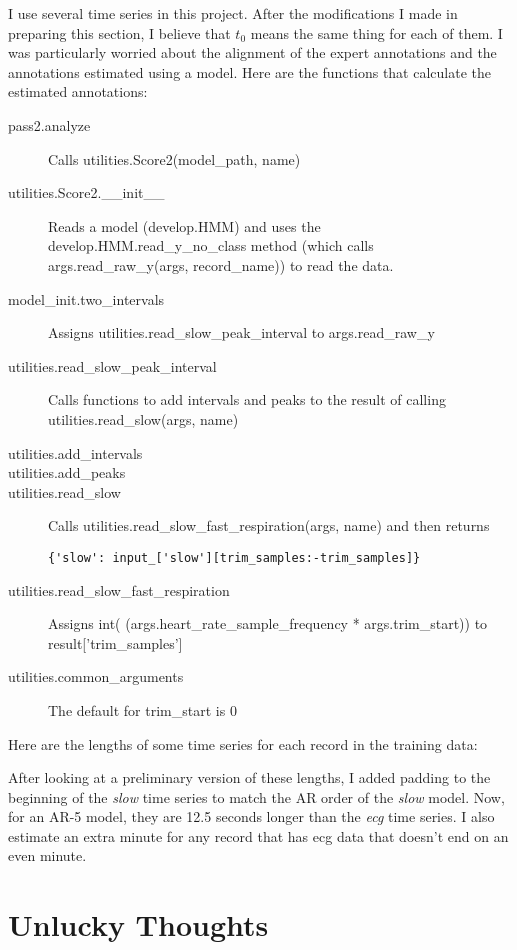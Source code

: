 \documentclass[12pt]{article}
\begin{document}
I use several time series in this project.  After the modifications I
made in preparing this section, I believe that $t_0$ means the same
thing for each of them.  I was particularly worried about the alignment
of the expert annotations and the annotations estimated using a model.
Here are the functions that calculate the estimated annotations:
\begin{description}
\item[pass2.analyze] Calls utilities.Score2(model\_path, name)
\item[utilities.Score2.\_\_init\_\_] Reads a model (develop.HMM) and
  uses the develop.HMM.read\_y\_no\_class method (which calls
  args.read\_raw\_y(args, record\_name)) to read the data.
\item[model\_init.two\_intervals] Assigns
  utilities.read\_slow\_peak\_interval to args.read\_raw\_y
\item[utilities.read\_slow\_peak\_interval] Calls functions to add
  intervals and peaks to the result of calling
  utilities.read\_slow(args, name)
\item[utilities.add\_intervals] 
\item[utilities.add\_peaks]
\item[utilities.read\_slow] Calls
  utilities.read\_slow\_fast\_respiration(args, name) and then returns
\begin{verbatim}
{'slow': input_['slow'][trim_samples:-trim_samples]}
\end{verbatim}
\item[utilities.read\_slow\_fast\_respiration] Assigns int(
  (args.heart\_rate\_sample\_frequency * args.trim\_start)) to
  result['trim\_samples']
\item[utilities.common\_arguments] The default for trim\_start is 0
\end{description}

Here are the lengths of some time series for each record in the
training data:



After looking at a preliminary version of these lengths, I added
padding to the beginning of the \emph{slow} time series to match the
AR order of the \emph{slow} model.  Now, for an AR-5 model, they are
12.5 seconds longer than the \emph{ecg} time series.  I also estimate
an extra minute for any record that has ecg data that doesn't end on
an even minute.

\section{Unlucky Thoughts}
\label{sec:unlucky}
\end{document}
